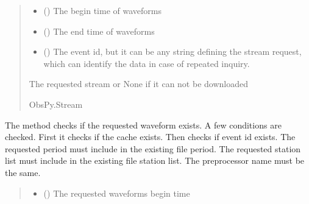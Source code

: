 \documentclass[letterpaper,10pt,english]{sphinxmanual}
\begin{document}
\begin{fulllineitems}
\begin{fulllineitems}
\begin{quote}
\begin{description}
\begin{itemize}
\item {} 
\sphinxAtStartPar
{} () \textendash{} The begin time of waveforms

\item {} 
\sphinxAtStartPar
{} () \textendash{} The end time of waveforms

\item {} 
\sphinxAtStartPar
{} () \textendash{} The event id, but it can be any string defining the stream request,
which can identify the data in case of repeated inquiry.

\end{itemize}

\sphinxAtStartPar
The requested stream or None if it can not be downloaded

\sphinxAtStartPar
ObsPy.Stream

\end{description}\end{quote}

\end{fulllineitems}


\begin{fulllineitems}
\label{\detokenize{api_core:core.signal_utils.StreamLoader.exist_file}}
\pysigstartsignatures
{}
\pysigstopsignatures
\sphinxAtStartPar
The method checks if the requested waveform exists. A few conditions are checked.
First it checks if the cache exists. Then checks if event id exists.
The requested period must include in the existing file period.
The requested station list must include in the existing file station list.
The preprocessor name must be the same.
\begin{quote}\begin{description}
\begin{itemize}
\item {} 
\sphinxAtStartPar
{} () \textendash{} The requested waveforms begin time


\end{itemize}
\end{description}
\end{quote}
\end{fulllineitems}
\end{fulllineitems}
\end{document}
